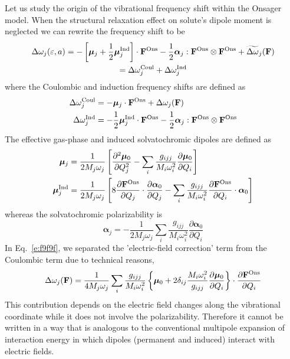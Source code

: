 \documentclass[a4paper,titlepage,twoside,fleqn,12pt]{book}
\newcommand{\BM}[1]{\bm{#1}}
\newcommand{\fderiv}[2]{\ensuremath{
\frac{\partial #1}{\partial #2}}}
\newcommand{\sderiv}[2]{\ensuremath{
\frac{\partial^2 #1}{\partial #2^2}
}}
\begin{document}
\begin{refsection}
Let us study the origin of the vibrational frequency shift
within the Onsager model. 
When the structural relaxation effect on solute's dipole moment
is neglected we can rewrite the frequency shift to be
%
\begin{multline} \label{e:f9f9f}
 \Delta\omega_j(\varepsilon, a) = 
- \left[ {\BM \mu}_j + \frac{1}{2} {\BM \mu}_j^{\rm Ind} \right] \cdot {\bf F}^{\rm Ons} 
- \frac{1}{2} {\BM \alpha}_j : {\bf F}^{\rm Ons} \otimes {\bf F}^{\rm Ons} 
+ \widetilde{\Delta\omega}_j({\bf F})
\\ = \Delta\omega_j^{\rm Coul} + \Delta\omega_j^{\rm Ind}
\end{multline}
%
where the Coulombic and induction frequency shifts 
are defined as
%
\begin{subequations}
 \begin{align}
   \Delta\omega_j^{\rm Coul}             &= - {\BM \mu}_j \cdot {\bf F}^{\rm Ons} + \Delta\omega_j({\bf F})\\
   \Delta\omega_j^{\rm Ind}              &= - \frac{1}{2} {\BM \mu}_j^{\rm Ind} \cdot {\bf F}^{\rm Ons} 
       - \frac{1}{2} {\BM \alpha}_j : {\bf F}^{\rm Ons} \otimes {\bf F}^{\rm Ons} 
 \end{align}
\end{subequations}
%
The effective gas\hyp{}phase and induced solvatochromic dipoles
are defined as
%
\begin{subequations}
 \begin{align}
   {\BM \mu}_j &= \frac{1}{2M_j\omega_j}
\left[  \sderiv{{\BM\mu}_0}{Q_j}
- \sum_i \frac{g_{ijj}}{M_i\omega_i^2} \fderiv{{\BM\mu}_0}{Q_i}
\right] \\
   {\BM \mu}_j^{\rm Ind} &= \frac{1}{2M_j\omega_j} 
\left[ 8 \fderiv{{\bf F}^{\rm Ons}}{Q_j} \cdot \fderiv{{\BM\alpha}_0}{Q_j} - 
   \sum_i \frac{g_{ijj}}{M_i\omega_i^2} \fderiv{{\bf F}^{\rm Ons}}{Q_i} \cdot {\BM\alpha}_0
\right]
 \end{align}
\end{subequations}
%
whereas the solvatochromic polarizability is
%
\begin{equation} 
  {\BM \alpha}_j = - \frac{1}{2M_j\omega_j} 
   \sum_i \frac{g_{ijj}}{M_i\omega_i^2} \fderiv{{\BM\alpha}_0}{Q_i}
\end{equation}
%
In Eq.~\eqref{e:f9f9f}, we separated the 'electric-field correction'
term from the Coulombic term due to technical reasons,
%
\begin{equation} 
\Delta\omega_j({\bf F}) = \frac{1}{4M_j\omega_j}
\sum_i \frac{g_{ijj}}{M_i\omega_i^2} \left\{ {\BM\mu}_0 + 
2\delta_{ij}\frac{M_i\omega_i^2}{g_{ijj}}\fderiv{{\BM\mu}_0}{Q_i}\right\} \cdot \fderiv{{\bf F}^{\rm Ons}}{Q_i}
\end{equation}
%
This contribution depends on the electric field changes along the vibrational
coordinate while it does not involve the polarizability. Therefore
it cannot be written in a way that is analogous
to the conventional multipole expansion of interaction energy 
in which dipoles (permanent and induced) interact with electric fields.


\end{refsection}
\end{document}
